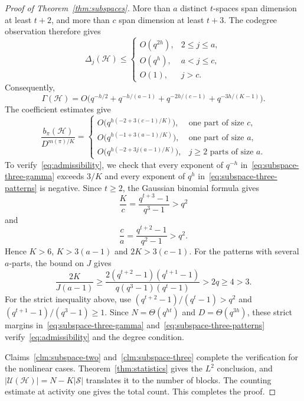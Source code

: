 \documentclass[11pt,reqno]{amsart}
\makeatletter
\numberwithin{equation}{section}
\theoremstyle{plain}
\newenvironment{claimproof}[1][Proof]{\par
    \pushQED{\qed}%
    \renewcommand{\qedsymbol}{$\blacksquare$}
    \normalfont \topsep6\p@\@plus6\p@\relax
    \trivlist
    \item[\hskip\labelsep
    \textit{#1}\@addpunct{.}~]\ignorespaces
}{%
    \popQED\endtrivlist\@endpefalse
}
\theoremstyle{definition}
\newcommand{\calH}{\mathcal{H}}
\newcommand{\calS}{\mathcal{S}}
\newcommand{\calU}{\mathcal U}
\makeatother
\begin{document}
\begin{proof}[Proof of Theorem~\ref{thm:subspaces}]
\begin{claimproof}[Proof of Claim~\ref{clm:subspace-three}]
    More than $a$ distinct $t$-spaces span dimension at least $t+2$, and more than $c$ span dimension at least $t+3$.
    The codegree observation therefore gives
    \[
        \Delta_j(\calH)\le
        \begin{cases}
            O(q^{2h}),&2\le j\le a,\\
            O(q^h),&a<j\le c,\\
            O(1),&j>c.
        \end{cases}
    \]
    Consequently,
    \begin{equation}\label{eq:subspace-three-gamma}
        \Gamma(\calH)=O\bigl(q^{-h/2}+q^{-h/(a-1)}+q^{-2h/(c-1)}+q^{-3h/(K-1)}\bigr).
    \end{equation}
    The coefficient estimates give
    \begin{equation}\label{eq:subspace-three-patterns}
        \frac{b_\pi(\calH)}{D^{m(\pi)/K}}=
        \begin{cases}
            O\bigl(q^{h(-2+3(c-1)/K)}\bigr),&\text{one part of size }c,\\
            O\bigl(q^{h(-1+3(a-1)/K)}\bigr),&\text{one part of size }a,\\
            O\bigl(q^{h(-2+3j(a-1)/K)}\bigr),&\text{$j\ge2$ parts of size }a.
        \end{cases}
    \end{equation}
    To verify~\eqref{eq:admissibility}, we check that every exponent of $q^{-h}$ in~\eqref{eq:subspace-three-gamma} exceeds $3/K$ and every exponent of $q^h$ in~\eqref{eq:subspace-three-patterns} is negative.
    Since $t\ge2$, the Gaussian binomial formula gives
    \[
        \frac Kc=\frac{q^{t+3}-1}{q^3-1}>q^2
    \]
    and
    \[
        \frac ca=\frac{q^{t+2}-1}{q^2-1}>q^2.
    \]
    Hence $K>6$, $K>3(a-1)$ and $2K>3(c-1)$.
    For the patterns with several $a$-parts, the bound on $J$ gives
    \[
        \frac{2K}{J(a-1)}\ge\frac{2(q^{t+2}-1)(q^{t+1}-1)}{q(q^3-1)(q^t-1)}>2q\ge4>3.
    \]
    For the strict inequality above, use $(q^{t+2}-1)/(q^t-1)>q^2$ and $(q^{t+1}-1)/(q^3-1)\ge1$.
    Since $N=\Theta(q^{ht})$ and $D=\Theta(q^{3h})$, these strict margins in~\eqref{eq:subspace-three-gamma} and~\eqref{eq:subspace-three-patterns} verify~\eqref{eq:admissibility} and the degree condition.
    \end{claimproof}

    Claims~\ref{clm:subspace-two} and~\ref{clm:subspace-three} complete the verification for the nonlinear cases.
    Theorem~\ref{thm:statistics} gives the $L^2$ conclusion, and $|\calU(\calH)|=N-K|\calS|$ translates it to the number of blocks.
    The counting estimate at activity one gives the total count.
    This completes the proof.
\end{proof}
\end{document}
